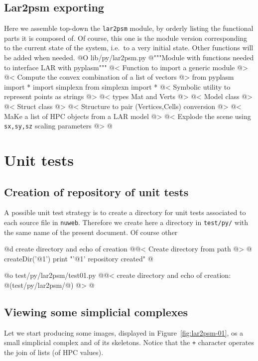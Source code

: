 \documentclass[11pt,oneside]{article}	%
\begin{document}
\subsection{Lar2psm exporting}
\label{sec:lar2psm}
Here we assemble top-down the \texttt{lar2psm} module, by orderly listing the functional parts it is composed of. Of course, this one is the module version corresponding to the current state of the system, i.e.~to a very initial state. Other functions will be added when needed.
@O lib/py/lar2psm.py
@{"""Module with functions needed to interface LAR with pyplasm"""
@< Function to import a generic module @>
@< Compute the convex combination of a list of vectors @>
from pyplasm import *
import simplexn
from simplexn import *
@< Symbolic utility to represent points as strings @>
@< types Mat and Verts @>
@< Model class @>
@< Struct class @>
@< Structure to pair (Vertices,Cells) conversion @>
@< MaKe a list of HPC objects from a LAR model @>
@< Explode the scene using \texttt{sx,sy,sz} scaling parameters @>
@}


\section{Unit tests}

\subsection{Creation of repository of unit tests}

A possible unit test strategy is to create a directory for unit tests associated to each source file in \texttt{nuweb}. Therefore we create here a directory in \texttt{test/py/} with the same name of the present document. Of course other 

@d create directory and echo of creation
@{@< Create directory from path @>
@%
createDir('@1')
print "'@1' repository created"
@}

@o test/py/lar2psm/test01.py
@{@< create directory  and echo of creation: @(test/py/lar2psm/@) @>
@}


\subsection{Viewing some simplicial complexes}
Let we start producing some images, displayed in Figure~\ref{fig:lar2psm-01}, os a small simplicial complex and of its skeletons. Notice that the \texttt{+} character operates the join of lists (of HPC values).
\end{document}
